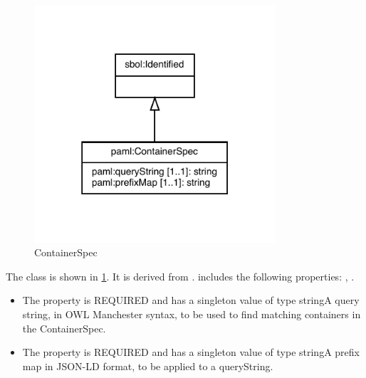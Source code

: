 \begin{figure}[h!]%
\centering%
\includegraphics[width=0.8\textwidth]{paml_classes/ContainerSpec_abstraction_hierarchy.pdf}%
\caption{ContainerSpec}%
\label{fig:ContainerSpec}%
\end{figure}

%
The  class is shown in \ref{fig:ContainerSpec}. It is derived from .%
 includes the following properties: , . %
\begin{itemize}%
\item%
The  property is REQUIRED and has a singleton value of type stringA query string, in OWL Manchester syntax, to be used to find matching containers in the ContainerSpec.%
\item%
The  property is REQUIRED and has a singleton value of type stringA prefix map in JSON-LD format, to be applied to a queryString.%
\end{itemize}

%
